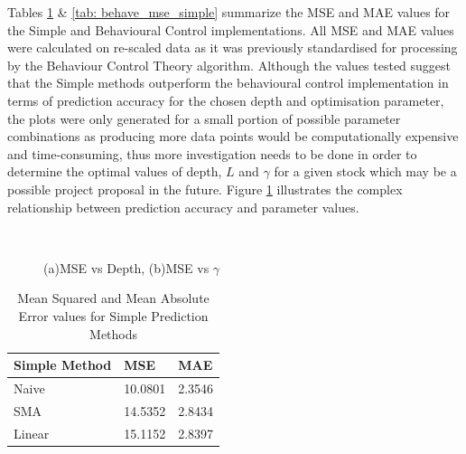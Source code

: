 \noindent Tables \ref{tab: simple_mse_behave} \& \ref{tab: behave_mse_simple} summarize the MSE and MAE values for the Simple and Behavioural Control implementations. All MSE and MAE values were calculated on re-scaled data as it was previously standardised for processing by the Behaviour Control Theory algorithm. Although the values tested suggest that the Simple methods outperform the behavioural control implementation in terms of prediction accuracy for the chosen depth and optimisation parameter, the plots were only generated for a small portion of possible parameter combinations as producing more data points would be computationally expensive and time-consuming, thus more investigation needs to be done in order to determine the optimal values of depth, $L$ and $\gamma$ for a given stock which may be a possible project proposal in the future. Figure \ref{fig: MSE_vs_depth_gamma} illustrates the complex relationship between prediction accuracy and parameter values. 

\begin{figure}[h]
  \centering
  \quad
   \\
  \caption{(a)MSE vs Depth, (b)MSE vs $\gamma$} 
  \label{fig: MSE_vs_depth_gamma}
\end{figure}

\begin{table}[h!]
    \begin{center}
        \begin{tabular}{|l|l|l|}
        \hline
        Simple Method & MSE     & MAE    \\ \hline
        Naive         & 10.0801 & 2.3546 \\ \hline
        SMA           & 14.5352 & 2.8434 \\ \hline
        Linear        & 15.1152 & 2.8397 \\ \hline
        \end{tabular}
    \end{center}
    \caption{Mean Squared and Mean Absolute Error values for Simple Prediction Methods}
    \label{tab: simple_mse_behave}
\end{table}

